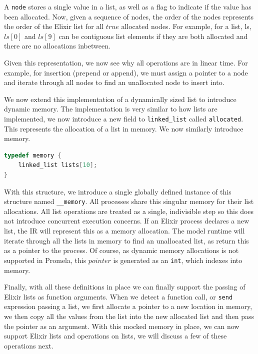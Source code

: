 A \texttt{node} stores a single value in a list, as well as a flag to indicate if the value has been allocated. Now, given a sequence of nodes, the order of the nodes represents the order of the Elixir list for all $true$ allocated nodes. For example, for a list, ls, $ls[0]$ and $ls[9]$ can be contiguous list elements if they are both allocated and there are no allocations inbetween.
\par
Given this representation, we now see why all operations are in linear time. For example, for insertion (prepend or append), we must assign a pointer to a node and iterate through all nodes to find an unallocated node to insert into.
\par
We now extend this implementation of a dynamically sized list to introduce dynamic memory. The implementation is very similar to how lists are implemented, we now introduce a new field to \texttt{linked\_list} called \texttt{allocated}. This represents the allocation of a list in memory. We now similarly introduce memory.
\begin{lstlisting}[language=C, xleftmargin=.1\linewidth, caption={Memory intermediate representation.}]
typedef memory {
    linked_list lists[10];
}
\end{lstlisting}
With this structure, we introduce a single globally defined instance of this structure named \texttt{\_\_memory}. All processes share this singular memory for their list allocations. All list operations are treated as a single, indivisible step so this does not introduce concurrent execution concerns. If an Elixir process declares a new list, the IR will represent this as a memory allocation. The model runtime will iterate through all the lists in memory to find an unallocated list, as return this as a pointer to the process. Of course, as dynamic memory allocations is not supported in Promela, this $pointer$ is generated as an \texttt{int}, which indexes into memory. 
\par
Finally, with all these definitions in place we can finally support the passing of Elixir lists as function arguments. When we detect a function call, or \texttt{send} expression passing a list, we first allocate a pointer to a new location in memory, we then copy all the values from the list into the new allocated list and then pass the pointer as an argument. With this mocked memory in place, we can now support Elixir lists and operations on lists, we will discuss a few of these operations next.
\par
